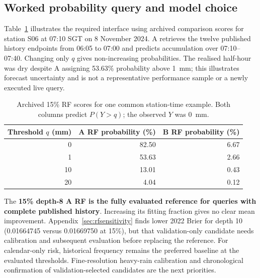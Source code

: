 \subsection{Worked probability query and model choice}
Table~\ref{tab:workedquery} illustrates the required interface using archived comparison scores for station S06 at 07:10 SGT on 8 November 2024. A retrieves the twelve published history endpoints from 06:05 to 07:00 and predicts accumulation over 07:10--07:40. Changing only $q$ gives non-increasing probabilities. The realised half-hour was dry despite A assigning 53.63\% probability above 1~mm; this illustrates forecast uncertainty and is not a representative performance sample or a newly executed live query.
\begin{table}[htbp]\centering\small
\begin{tabular}{rrr}\toprule
Threshold $q$ (mm) & A RF probability (\%) & B RF probability (\%)\\\midrule
0 & 82.50 & 6.67 \\
1 & 53.63 & 2.66 \\
10 & 13.01 & 0.43 \\
20 & 4.04 & 0.12 \\
\bottomrule\end{tabular}
\caption{Archived 15\% RF scores for one common station-time example. Both columns predict $P(Y>q)$; the observed $Y$ was 0~mm.}\label{tab:workedquery}
\end{table}

The \textbf{15\% depth-8 A RF is the fully evaluated reference for queries with complete published history}. Increasing its fitting fraction gives no clear mean improvement. Appendix~\ref{sec:rfsensitivity} finds lower 2022 Brier for depth 10 (0.01664745 versus 0.01669750 at 15\%), but that validation-only candidate needs calibration and subsequent evaluation before replacing the reference. For calendar-only risk, historical frequency remains the preferred baseline at the evaluated thresholds. Fine-resolution heavy-rain calibration and chronological confirmation of validation-selected candidates are the next priorities.
